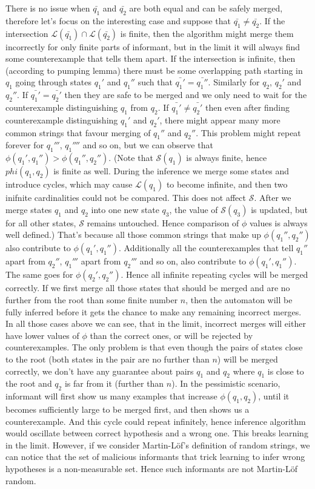 There is no issue when $\bar{q_1}$ and $\bar{q_2}$ are both equal and can be safely merged, therefore let's focus on the interesting case and
suppose that $\bar{q_1}\ne\bar{q_2}$.  If the intersection $\mathcal{L}(\bar{q_1}) \cap \mathcal{L}(\bar{q_2})$ is finite, then the algorithm might merge them incorrectly for only finite parts of informant, but in the limit it will always find some counterexample that tells them apart. If the intersection is infinite, then (according to pumping lemma) there must be some overlapping path starting in $q_1$ going through states $q_1'$ and $q_1''$ such that $\bar{q_1'}=\bar{q_1''}$. Similarly for $q_2$, $q_2'$ and $q_2''$. If $\bar{q_1'}=\bar{q_2'}$ then they are safe to be merged and we only need to wait for the counterexample distinguishing $q_1$ from $q_2$. If  $\bar{q_1'}\ne\bar{q_2'}$ then even after finding counterexample distinguishing $q_1'$ and $q_2'$, there might appear many more common strings that favour merging of $q_1''$ and $q_2''$. This problem might repeat forever for $q_1'''$, $q_1''''$ and so on, but we can observe that $\phi(q_1',q_1'') > \phi(q_1'',q_2'')$. (Note that $\mathcal{S}(q_1)$ is always finite, hence $phi(q_1,q_2)$ is finite as well.  During the inference we merge some states and introduce cycles, which may cause $\mathcal{L}(q_1)$ to become infinite, and then two inifnite cardinalities could not be compared. This does not affect $\mathcal{S}$. After we merge states $q_1$ and $q_2$ into one new state $q_3$, the value of $\mathcal{S}(q_3)$ is updated, but for all other states,  $\mathcal{S}$ remains untouched. Hence comparison of $\phi$ values is always well defined.) That's because all those common strings that make up $ \phi(q_1'',q_2'')$ also contribute to $\phi(q_1',q_1'')$. Additionally all the counterexamples that tell $q_1''$ apart from $q_2''$, $q_1'''$ apart from $q_2'''$ and so on, also contribute to $\phi(q_1',q_1'')$. The same goes for $\phi(q_2',q_2'')$. Hence all infinite repeating cycles will be merged correctly. If we first merge all those states that should be merged and are no further from the root than some finite number $n$, then the automaton will be fully inferred before it gets the chance to make any remaining incorrect merges. In all those cases above we can see, that in the limit, incorrect merges will either have lower values of $\phi$ than the correct ones, or will be rejected by counterexamples. The only problem is that even though the pairs of states close to the root (both states in the pair are no further than $n$) will be merged correctly, we don't have any guarantee about pairs $q_1$ and $q_2$  where $q_1$ is close to the root and  $q_2$ is far from it (further than $n$). In the pessimistic scenario, informant will first show us many examples that increase $\phi(q_1,q_2)$, until it becomes sufficiently large to be merged first, and then shows us a counterexample. And this cycle could repeat infinitely, hence inference algorithm would oscillate between correct hypothesis and a wrong one. This breaks learning in the limit. However, if we consider Martin-Löf's definition of random strings, we can notice that the set of malicious informants that trick learning to infer wrong hypotheses is a non-measurable set. Hence such informants are not Martin-Löf random. 

